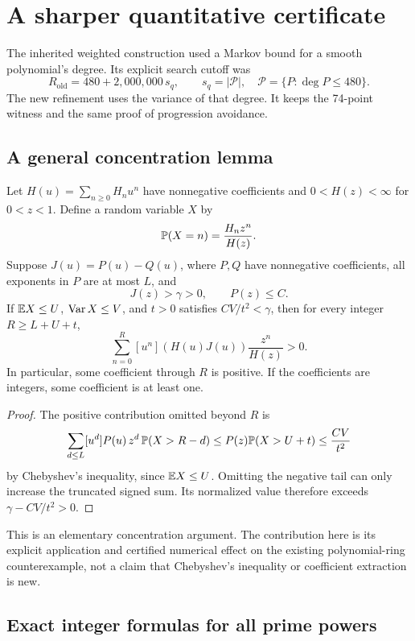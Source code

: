 \section{A sharper quantitative certificate}\label{sec:refinement}

The inherited weighted construction used a Markov bound for a smooth
polynomial's degree. Its explicit search cutoff was
\[
 R_{\mathrm{old}}=480+2{,}000{,}000\,s_q,\qquad
 s_q=|\mathcal P|,\quad \mathcal P=\{P:\deg P\le480\}.
\]
The new refinement uses the variance of that degree. It keeps the
74-point witness and the same proof of progression avoidance.

\subsection{A general concentration lemma}

\begin{lemma}
\label{lem:concentration}
Let \(H(u)=\sum_{n\ge0}H_nu^n\) have nonnegative coefficients and
\(0<H(z)<\infty\) for \(0<z<1\). Define a random variable \(X\) by
\[
 \mathbb P(X=n)=\frac{H_nz^n}{H(z)}.
\]
Suppose \(J(u)=P(u)-Q(u)\), where \(P,Q\) have nonnegative coefficients,
all exponents in \(P\) are at most \(L\), and
\[
 J(z)>\gamma>0,\qquad P(z)\le C.
\]
If \(\mathbb E X\le U\), \(\operatorname{Var} X\le V\), and \(t>0\) satisfies
\(CV/t^2<\gamma\), then for every integer \(R\ge L+U+t\),
\[
 \sum_{n=0}^R[u^n](H(u)J(u))\frac{z^n}{H(z)}>0.
\]
In particular, some coefficient through \(R\) is positive. If the
coefficients are integers, some coefficient is at least one.
\end{lemma}

\begin{proof}
The positive contribution omitted beyond \(R\) is
\[
 \sum_{d\le L}[u^d]P(u)\,z^d\,\mathbb P(X>R-d)
 \le P(z)\mathbb P(X>U+t)
 \le \frac{CV}{t^2}
\]
by Chebyshev's inequality, since \(\mathbb E X\le U\).
Omitting the negative tail can only increase the truncated signed sum.
Its normalized value therefore exceeds \(\gamma-CV/t^2>0\).
\end{proof}

This is an elementary concentration argument. The contribution here is
its explicit application and certified numerical effect on the existing
polynomial-ring counterexample, not a claim that Chebyshev's inequality
or coefficient extraction is new.

\subsection{Exact integer formulas for all prime powers}

